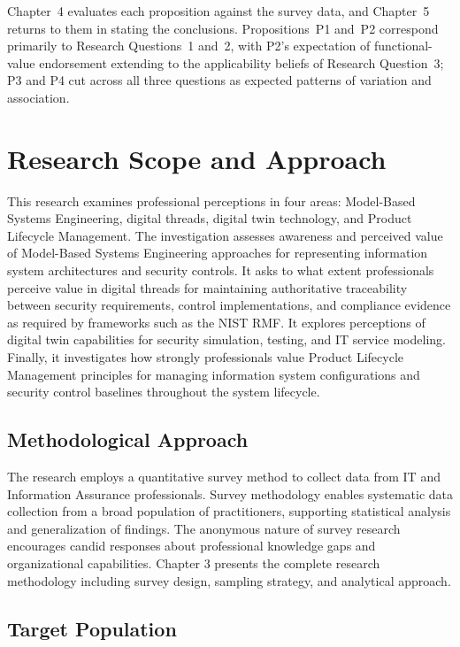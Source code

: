 Chapter~4 evaluates each proposition against the survey data, and Chapter~5 returns to them in stating the conclusions. Propositions~P1 and~P2 correspond primarily to Research Questions~1 and~2, with P2's expectation of functional-value endorsement extending to the applicability beliefs of Research Question~3; P3 and P4 cut across all three questions as expected patterns of variation and association.

\section{Research Scope and Approach}

This research examines professional perceptions in four areas: Model-Based Systems Engineering, digital threads, digital twin technology, and Product Lifecycle Management. The investigation assesses awareness and perceived value of Model-Based Systems Engineering approaches for representing information system architectures and security controls. It asks to what extent professionals perceive value in digital threads for maintaining authoritative traceability between security requirements, control implementations, and compliance evidence as required by frameworks such as the NIST RMF\@. It explores perceptions of digital twin capabilities for security simulation, testing, and IT service modeling. Finally, it investigates how strongly professionals value Product Lifecycle Management principles for managing information system configurations and security control baselines throughout the system lifecycle.

\subsection{Methodological Approach}

The research employs a quantitative survey method to collect data from IT and Information Assurance professionals. Survey methodology enables systematic data collection from a broad population of practitioners, supporting statistical analysis and generalization of findings. The anonymous nature of survey research encourages candid responses about professional knowledge gaps and organizational capabilities. Chapter 3 presents the complete research methodology including survey design, sampling strategy, and analytical approach.

\subsection{Target Population}

